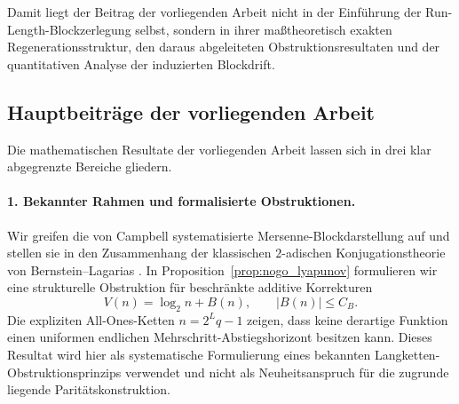 \documentclass[11pt,reqno]{amsart}
\theoremstyle{definition}
\theoremstyle{remark}
\numberwithin{equation}{section}
\begin{document}
Damit liegt der Beitrag der vorliegenden Arbeit nicht in der Einf\"uhrung der Run-Length-Blockzerlegung selbst, sondern in ihrer ma\ss{}theoretisch exakten Regenerationsstruktur, den daraus abgeleiteten Obstruktionsresultaten und der quantitativen Analyse der induzierten Blockdrift.

\subsection{Hauptbeitr\"age der vorliegenden Arbeit}

Die mathematischen Resultate der vorliegenden Arbeit lassen sich in drei klar abgegrenzte Bereiche gliedern.

\paragraph{1. Bekannter Rahmen und formalisierte Obstruktionen.}
Wir greifen die von Campbell \cite{Campbell2025} systematisierte Mersenne-Blockdarstellung auf und stellen sie in den Zusammenhang der klassischen $2$-adischen Konjugationstheorie von Bernstein--Lagarias \cite{BernsteinLagarias1996}. In Proposition~\ref{prop:nogo_lyapunov} formulieren wir eine strukturelle Obstruktion f\"ur beschr\"ankte additive Korrekturen
\begin{equation}
V(n) = \log_2 n + B(n), \qquad |B(n)| \le C_B.
\end{equation}
Die expliziten All-Ones-Ketten $n = 2^L q - 1$ zeigen, dass keine derartige Funktion einen uniformen endlichen Mehrschritt-Abstiegshorizont besitzen kann. Dieses Resultat wird hier als systematische Formulierung eines bekannten Langketten-Obstruktionsprinzips verwendet und nicht als Neuheitsanspruch f\"ur die zugrunde liegende Parit\"atskonstruktion.
\end{document}
